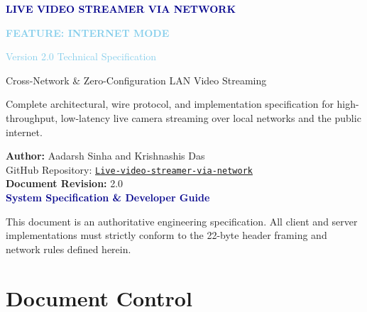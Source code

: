 \documentclass[11pt,a4paper]{article}
\begin{document}
\begin{titlepage}
    \centering
    \vspace*{1.5cm}
    {\Huge\bfseries\textcolor{darkblue}{LIVE VIDEO STREAMER VIA NETWORK}\par}
    \vspace{0.4cm}
    {\Huge\bfseries\textcolor{skyblue}{FEATURE: INTERNET MODE}\par}
    \vspace{0.8cm}
    {\LARGE\textcolor{skyblue}{Version 2.0 Technical Specification}\par}
    \vspace{0.3cm}
    {\large\textcolor{codegray}{Cross-Network \& Zero-Configuration LAN Video Streaming}\par}
    \vspace{2cm}
    {\large Complete architectural, wire protocol, and implementation specification for high-throughput, low-latency live camera streaming over local networks and the public internet.\par}
    \vspace{2.5cm}

    {\normalsize
        \textbf{Author:} Aadarsh Sinha and Krishnashis Das\\
        GitHub Repository: \href{https://github.com/live-video-streamer}{\texttt{Live-video-streamer-via-network}}\\[1em]
        \textbf{Document Revision:} 2.0\\
        \vspace{0.8cm}
        \LARGE\textcolor{darkblue}{\textbf{System Specification \& Developer Guide}}
    }

    \vfill
    {\footnotesize\textcolor{codegray}{This document is an authoritative engineering specification. All client and server implementations must strictly conform to the 22-byte header framing and network rules defined herein.}}
\end{titlepage}

\newpage
\section*{Document Control}
\end{document}
